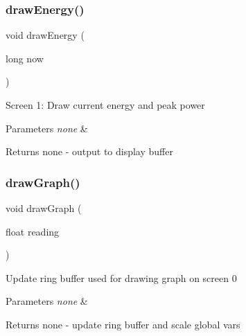 \subsubsection{\texorpdfstring{draw\+Energy()}{drawEnergy()}}
{\footnotesize\ttfamily void draw\+Energy (\begin{DoxyParamCaption}\item[{long}]{now }\end{DoxyParamCaption})}

Screen 1\+: Draw current energy and peak power


\begin{DoxyParams}{Parameters}
{\em none} & \\
\hline
\end{DoxyParams}
\begin{DoxyReturn}{Returns}
none -\/ output to display buffer 
\end{DoxyReturn}
\hypertarget{_u_s_b___tester___o_l_e_d__128x64___beta__2_82_8ino_a58031557270dff55a205bc0cba647f24}{}\label{_u_s_b___tester___o_l_e_d__128x64___beta__2_82_8ino_a58031557270dff55a205bc0cba647f24} 
\subsubsection{\texorpdfstring{draw\+Graph()}{drawGraph()}}
{\footnotesize\ttfamily void draw\+Graph (\begin{DoxyParamCaption}\item[{float}]{reading }\end{DoxyParamCaption})}

Update ring buffer used for drawing graph on screen 0


\begin{DoxyParams}{Parameters}
{\em none} & \\
\hline
\end{DoxyParams}
\begin{DoxyReturn}{Returns}
none -\/ update ring buffer and scale global vars 
\end{DoxyReturn}
\hypertarget{_u_s_b___tester___o_l_e_d__128x64___beta__2_82_8ino_af73b5b00706aac69454641a634e19343}{}\label{_u_s_b___tester___o_l_e_d__128x64___beta__2_82_8ino_af73b5b00706aac69454641a634e19343} 
